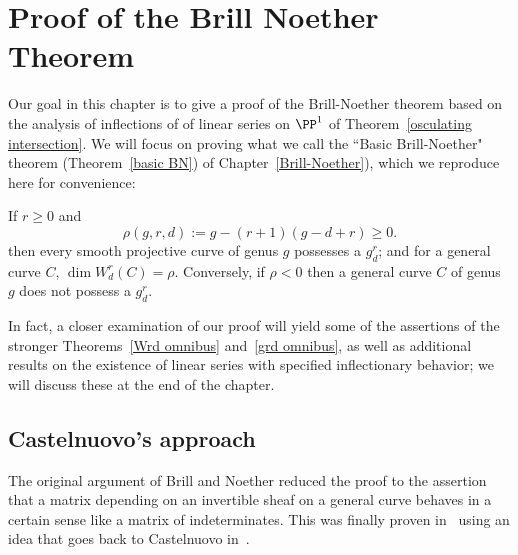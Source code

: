 

\chapter{Proof of the Brill Noether Theorem}\label{Brill Noether proof chapter}
\label{BrillNoetherproofChapter}

Our goal in this chapter is to give a proof of the Brill-Noether theorem based on the analysis
of inflections of of linear series on $\PP^{1}$ of Theorem~\ref{osculating intersection}. We will focus on proving what we call the ``Basic Brill-Noether" theorem (Theorem~\ref{basic BN}) of Chapter~\ref{Brill-Noether}), which we reproduce here for convenience:

\begin{theorem}\label{BN-basic}
If $r\geq 0$ and
 $$
 \rho(g,r,d) := g - (r+1)(g-d+r) \geq 0.
$$
then every smooth projective curve of genus $g$  possesses a $g^r_d$; and for a general curve $C$,  $\dim W^r_d(C) = \rho$. Conversely, if $\rho < 0$ then a general curve $C$ of genus $g$ does not possess a $g^r_d$.
\end{theorem}

In fact, a closer examination of our proof will yield some of the assertions of the stronger Theorems~\ref{Wrd omnibus} and~\ref{grd omnibus}, as well as additional results on the existence of linear series with specified inflectionary behavior; we will discuss these at the end of the chapter.


\section{Castelnuovo's approach}

The original argument of Brill and Noether reduced the proof to the assertion that a matrix depending
on an invertible sheaf on a general curve
behaves in a certain sense like a matrix of indeterminates. This was finally proven in~\cite{Griffiths-Harris-BN} using an idea that goes back to Castelnuovo in~\cite{zbMATH02692307}.


